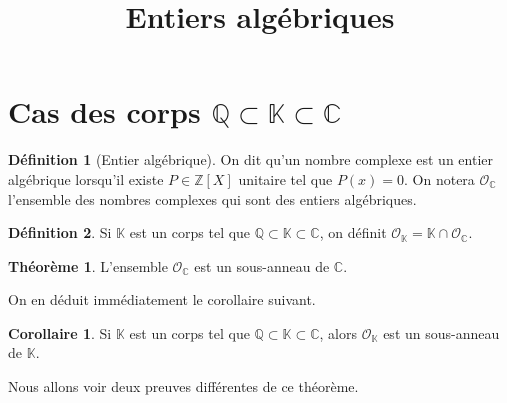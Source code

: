 \documentclass[french]{article}
\title{Entiers algébriques}
\newcommand{\Z}{\mathbb{Z}}
\newcommand{\Q}{\mathbb{Q}}
\newcommand{\C}{\mathbb{C}}
\newcommand{\K}{\mathbb{K}}
\theoremstyle{definition}
\newtheorem{dfn}{Définition}
\theoremstyle{theorem}
\newtheorem{thm}{Théorème}
\newtheorem{cor}{Corollaire}
\theoremstyle{remark}
\begin{document}
\maketitle
\section{Cas des corps $\Q\subset\K\subset\C$}
\begin{dfn}[Entier algébrique]
	On dit qu'un nombre complexe est un entier algébrique lorsqu'il existe $P\in\Z[X]$ unitaire tel que $P(x)=0$. On notera $\mathcal{O}_\C$ l'ensemble des nombres complexes qui sont des entiers algébriques.
\end{dfn}
\begin{dfn}
	Si $\K$ est un corps tel que $\Q\subset\K\subset\C$, on définit $\mathcal{O}_\K=\K\cap\mathcal{O}_\C$.
\end{dfn}

\begin{thm}
	L'ensemble $\mathcal{O}_\C$ est un sous-anneau de $\C$.
\end{thm}
On en déduit immédiatement le corollaire suivant.
\begin{cor}
	Si $\K$ est un corps tel que $\Q\subset\K\subset\C$, alors $\mathcal{O}_\K$ est un sous-anneau de $\K$.
\end{cor}
Nous allons voir deux preuves différentes de ce théorème.
\end{document}
